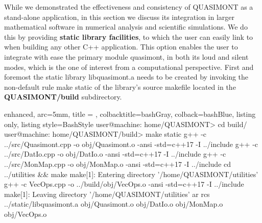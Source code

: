 \documentclass[a4paper, twosided]{book}
\begin{document}
\noindent
While we demonstrated the effectiveness and consistency of QUASIMONT as a stand-alone application, in this section we discuss its integration in larger mathematical software in numerical analysis and scientific simulations. We do this by providing \color{poliDarkBlue} \textbf{static library facilities}\color{black}, to which the user can easily link to when building any other C++ application. This option enables the user to integrate with ease the primary module \colorbox{poliGrayBlue}{quasimont}, in both its loud and silent modes, which is the one of interest from a computational perspective. First and foremost the static library \colorbox{poliGrayBlue}{libquasimont.a} needs to be created by invoking the non-default rule \colorbox{poliGrayBlue}{make static} of the library's source \colorbox{poliGrayBlue}{makefile} located in the \colorbox{poliGrayBlue}{\textbf{QUASIMONT/build}} subdirectory.

\vspace{0.2cm}
\begin{tcblisting}{enhanced,
                   arc=5mm,
                   title = \color{black}{\large \ttfamily Creation of libquasimont static library},
                   colbacktitle=bashGray,
                   colback=bashBlue,
                   listing only,
                   listing style=BashStyle}
user@machine: home/QUASIMONT> cd build/
user@machine: home/QUASIMONT/build> make static
g++ -c ../src/Quasimont.cpp -o obj/Quasimont.o -ansi -std=c++17 -I ../include 
g++ -c ../src/DatIo.cpp -o obj/DatIo.o -ansi -std=c++17 -I ../include 
g++ -c ../src/MonMap.cpp -o obj/MonMap.o -ansi -std=c++17 -I ../include 
cd ../utilities && make
make[1]: Entering directory '/home/QUASIMONT/utilities'
g++ -c VecOps.cpp -o ../build/obj/VecOps.o -ansi -std=c++17 -I ../include 
make[1]: Leaving directory '/home/QUASIMONT/utilities'
ar rcs ../static/libquasimont.a obj/Quasimont.o obj/DatIo.o obj/MonMap.o obj/VecOps.o
\end{tcblisting}
\vspace{0.3cm}
\end{document}
